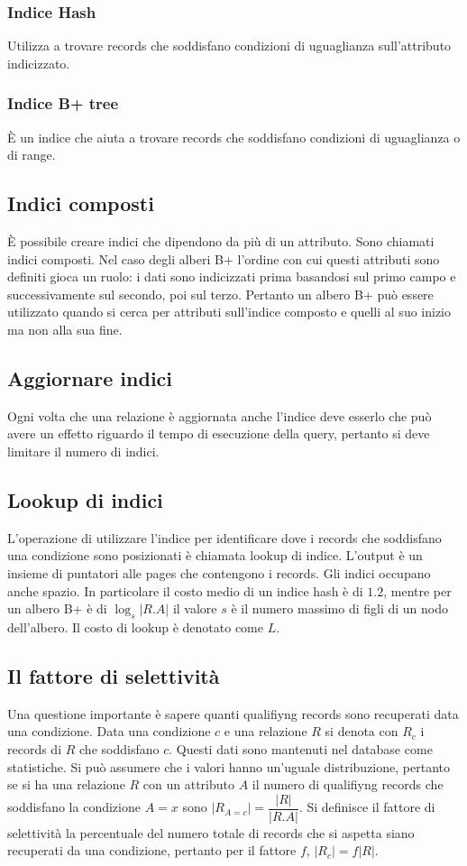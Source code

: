 \subsubsection{Indice Hash}
Utilizza a trovare records che soddisfano condizioni di uguaglianza sull'attributo indicizzato.
\subsubsection{Indice B+ tree}
\`E un indice che aiuta  a trovare records che soddisfano condizioni di uguaglianza o di range. 
\subsection{Indici composti}
\`E possibile creare indici che dipendono da pi\`u di un attributo. Sono chiamati indici composti. Nel caso degli alberi B+ l'ordine con cui questi attributi sono definiti gioca un ruolo: i dati sono indicizzati prima
basandosi sul primo campo e successivamente sul secondo, poi sul terzo. Pertanto un albero B+ pu\`o essere utilizzato quando si cerca per attributi sull'indice composto e quelli al suo inizio ma non alla sua fine. 
\subsection{Aggiornare indici}
Ogni volta che una relazione \`e aggiornata anche l'indice deve esserlo che pu\`o avere un effetto riguardo il tempo di esecuzione della query, pertanto si deve limitare il numero di indici.
\subsection{Lookup di indici}
L'operazione di utilizzare l'indice per identificare dove i records che soddisfano una condizione sono posizionati \`e chiamata lookup di indice. L'output \`e un insieme di puntatori alle pages che contengono i 
records. Gli indici occupano anche spazio. In particolare il costo medio di un indice hash \`e di $1.2$, mentre per un albero B+ \`e di $\log_s|R.A|$ il valore $s$ \`e il numero massimo di figli di un nodo dell'albero.
Il costo di lookup \`e denotato come $L$. 
\subsection{Il fattore di selettivit\`a}
Una questione importante \`e sapere quanti qualifiyng records sono recuperati data una condizione. Data una condizione $c$ e una relazione $R$ si denota con $R_c$ i records di $R$ che soddisfano $c$. Questi
dati sono mantenuti nel database come statistiche. Si pu\`o assumere che i valori hanno un'uguale distribuzione, pertanto se si ha una relazione $R$ con un attributo $A$ il numero di qualifiyng records che 
soddisfano la condizione $A=x$ sono $|R_{A=c}|=\dfrac{|R|}{|R.A|}$. Si definisce il fattore di selettivit\`a la percentuale del numero totale di records che si aspetta siano recuperati da una condizione, pertanto 
per il fattore $f$, $|R_c|=f|R|$. 
